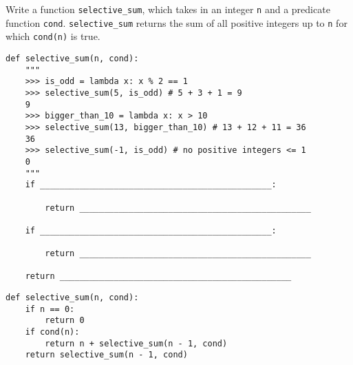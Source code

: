 \begin{blocksection}
    \question Write a function \lstinline{selective_sum}, which takes in an integer \lstinline{n} and a predicate function \lstinline{cond}. \lstinline{selective_sum} returns the sum of all positive integers up to \lstinline{n} for which \lstinline{cond(n)} is true. 
    
    \begin{lstlisting}
def selective_sum(n, cond):
    """
    >>> is_odd = lambda x: x % 2 == 1
    >>> selective_sum(5, is_odd) # 5 + 3 + 1 = 9
    9
    >>> bigger_than_10 = lambda x: x > 10
    >>> selective_sum(13, bigger_than_10) # 13 + 12 + 11 = 36
    36
    >>> selective_sum(-1, is_odd) # no positive integers <= 1
    0
    """
    if _______________________________________________:

        return _______________________________________________

    if _______________________________________________:

        return _______________________________________________

    return _______________________________________________
    \end{lstlisting}

    \begin{solution}[0.5in]
    \begin{lstlisting}
def selective_sum(n, cond):
    if n == 0:
        return 0
    if cond(n):
        return n + selective_sum(n - 1, cond)
    return selective_sum(n - 1, cond)
    \end{lstlisting}
    \end{solution}
    \end{blocksection}
    